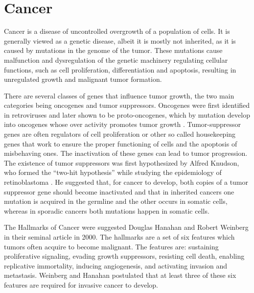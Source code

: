 
\section{Cancer}\label{cancer}

Cancer is a disease of uncontrolled overgrowth of a population of cells. It is
generally viewed as a genetic disease, albeit it is mostly not inherited, as it is
caused by  mutations in the genome of the tumor. These mutations cause malfunction
and dysregulation of the genetic machinery regulating cellular functions, such
as cell proliferation, differentiation and apoptosis, resulting in
unregulated growth and malignant tumor formation.

There are several classes of genes that influence tumor growth, the two main
categories being oncogenes and tumor suppressors. Oncogenes were first
identified in retroviruses and later shown to be proto-oncogenes, which by
mutation develop into oncogenes whose over activity promotes tumor growth
\citep{Varmus1988}. Tumor-suppressor genes are often regulators of cell
proliferation or other so called housekeeping genes that work to ensure the
proper functioning of cells and the apoptosis of misbehaving ones. The
inactivation of these genes can lead to tumor progression. The existence of
tumor suppressors was first hypothesized by Alfred Knudson, who formed the
“two-hit hypothesis” while studying the epidemiology of retinoblastoma
\citep{Knudson1971}. He suggested that, for cancer to develop, both copies of
a tumor suppressor gene should become inactivated and that in inherited
cancers one mutation is acquired in the germline and the other occurs in
somatic cells, whereas in sporadic cancers both mutations happen in somatic
cells.

The Hallmarks of Cancer were suggested Douglas Hanahan and Robert Weinberg \citep{Hanahan2000} in
their seminal article in 2000. The hallmarks are a set of
six features which tumors often acquire to become malignant. The features are:
sustaining proliferative signaling, evading growth suppressors, resisting cell
death, enabling replicative immortality, inducing angiogenesis, and activating
invasion and metastasis. Weinberg and Hanahan postulated that at least three
of these six features are required for invasive cancer to develop.

